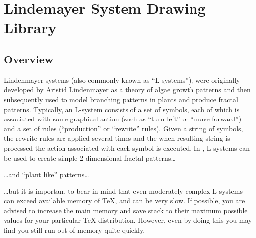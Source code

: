 %
%
%

\section{Lindemayer System Drawing Library}
\subsection{Overview}

Lindenmayer systems (also commonly known as ``L-systems''), were
originally developed by Aristid Lindenmayer as a theory of algae 
growth patterns and then subsequently used to model branching 
patterns in plants and produce fractal patterns.
Typically, an L-system consists of a set of symbols, each of which
is associated with some graphical action (such as ``turn left'' or 
``move forward'') and a set of rules (``production'' or ``rewrite'' 
rules). Given a string of symbols, the rewrite rules are applied 
several times and the when resulting string is processed the action 
associated with each symbol is executed. 
In \pgfname, L-systems can be used to create simple 2-dimensional
fractal patterns\ldots	
\begin{codeexample}[pre={\expandafter\let\csname pgf@lsystem@Koch curve\endcsname=\relax}]
\end{codeexample}

\ldots and ``plant like'' patterns\ldots

\begin{codeexample}[]
\end{codeexample}

\ldots but it is important to bear in mind that even moderately
complex L-systems can exceed available memory of \TeX, 
and can be very slow. 
If possible, you are advised to increase the main memory and save 
stack to their maximum possible values for your particular 
\TeX{} distribution. 
However, even by doing this you may find you still run out of memory
quite quickly.

